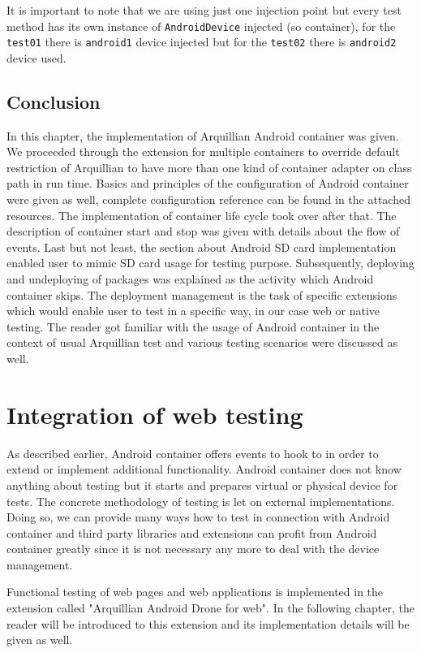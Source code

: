 \documentclass[12pt,final,oneside]{fithesis}
\begin{document}
It is important to note that we are using just one injection point but every test method has its own instance of \texttt{AndroidDevice} injected (so container), for the \texttt{test01} there is \texttt{android1} device injected but for the \texttt{test02} there is \texttt{android2} device used.

	\section{Conclusion}

In this chapter, the implementation of Arquillian Android container was given. We proceeded through the extension for multiple containers to override default restriction of Arquillian to have more than one kind of container adapter on class path in run time. Basics and principles of the configuration of Android container were given as well, complete configuration reference can be found in the attached resources. The implementation of container life cycle took over after that. The description of container start and stop was given with details about the flow of events. Last but not least, the section about Android SD card implementation enabled user to mimic SD card usage for testing purpose. Subsequently, deploying and undeploying of packages was explained as the activity which Android container skips. The deployment management is the task of specific extensions which would enable user to test in a specific way, in our case web or native testing. The reader got familiar with the usage of Android container in the context of usual Arquillian test and various testing scenarios were discussed as well.

\chapter{Integration of web testing}\label{integration-of-web-testing}

As described earlier, Android container offers events to hook to in order to extend or implement additional functionality. Android container does not know anything about testing but it starts and prepares virtual or physical device for tests. The concrete methodology of testing is let on external implementations. Doing so, we can provide many ways how to test in connection with Android container and third party libraries and extensions can profit from Android container greatly since it is not necessary any more to deal with the device management.

Functional testing of web pages and web applications is implemented in the extension called "Arquillian Android Drone for web". In the following chapter, the reader will be introduced to this extension and its implementation details will be given as well.
\end{document}
